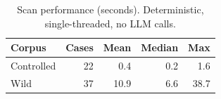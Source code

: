 \begin{table}[t]\centering\caption{Scan performance (seconds). Deterministic, single-threaded, no LLM calls.}\label{tab:perf}
\begin{tabular}{lrrrr}\toprule Corpus & Cases & Mean & Median & Max \\\midrule
Controlled & 22 & 0.4 & 0.2 & 1.6 \\
Wild & 37 & 10.9 & 6.6 & 38.7 \\
\bottomrule\end{tabular}\end{table}
